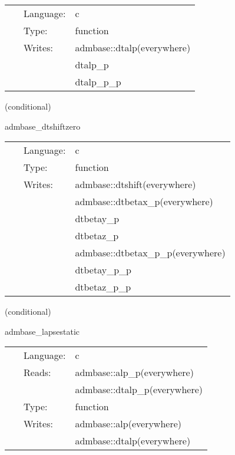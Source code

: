  \begin{tabular*}{160mm}{cll} 
~ & Language:  & c \\ 
~ & Type:  & function \\ 
~ & Writes:  & admbase::dtalp(everywhere) \\ 
~& ~ &dtalp\_p\\ 
~& ~ &dtalp\_p\_p\\ 
\end{tabular*} 


\vspace{5mm}

   (conditional) 

\hspace{5mm} admbase\_dtshiftzero 

\hspace{5mm}{\it set the dtshift to 0 at all points } 


\hspace{5mm}

 \begin{tabular*}{160mm}{cll} 
~ & Language:  & c \\ 
~ & Type:  & function \\ 
~ & Writes:  & admbase::dtshift(everywhere) \\ 
~& ~ &admbase::dtbetax\_p(everywhere)\\ 
~& ~ &dtbetay\_p\\ 
~& ~ &dtbetaz\_p\\ 
~& ~ &admbase::dtbetax\_p\_p(everywhere)\\ 
~& ~ &dtbetay\_p\_p\\ 
~& ~ &dtbetaz\_p\_p\\ 
\end{tabular*} 


\vspace{5mm}

   (conditional) 

\hspace{5mm} admbase\_lapsestatic 

\hspace{5mm}{\it copy the lapse to the current time level } 


\hspace{5mm}

 \begin{tabular*}{160mm}{cll} 
~ & Language:  & c \\ 
~ & Reads:  & admbase::alp\_p(everywhere) \\ 
~& ~ &admbase::dtalp\_p(everywhere)\\ 
~ & Type:  & function \\ 
~ & Writes:  & admbase::alp(everywhere) \\ 
~& ~ &admbase::dtalp(everywhere)\\ 
\end{tabular*} 


